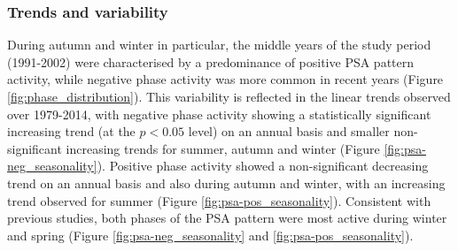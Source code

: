 \subsubsection{Trends and variability}

During autumn and winter in particular, the middle years of the study period (1991-2002) were characterised by a predominance of positive PSA pattern activity, while negative phase activity was more common in recent years (Figure \ref{fig:phase_distribution}). This variability is reflected in the linear trends observed over 1979-2014, with negative phase activity showing a statistically significant increasing trend (at the $p < 0.05$ level) on an annual basis and smaller non-significant increasing trends for summer, autumn and winter (Figure \ref{fig:psa-neg_seasonality}). Positive phase activity showed a non-significant decreasing trend on an annual basis and also during autumn and winter, with an increasing trend observed for summer (Figure \ref{fig:psa-pos_seasonality}). Consistent with previous studies, both phases of the PSA pattern were most active during winter and spring (Figure \ref{fig:psa-neg_seasonality} and \ref{fig:psa-pos_seasonality}). 

